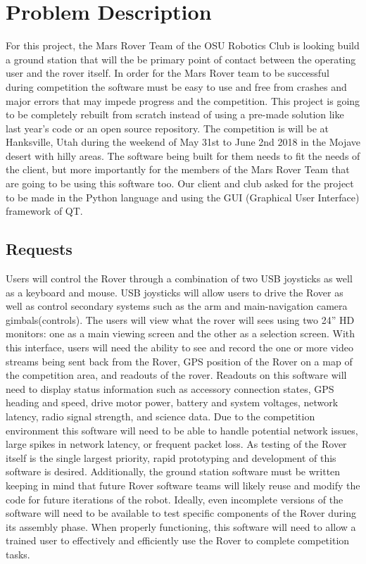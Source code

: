 \documentclass[onecolumn, draftclsnofoot, 10pt, compsoc]{IEEEtran}
\begin{document}
\section{Problem Description}\par
For this project, the Mars Rover Team of the OSU Robotics Club is looking build a ground station that will the be primary point of contact between the operating user and the rover itself.
In order for the Mars Rover team to be successful during competition the software must be easy to use and free from crashes and major errors that may impede progress and the competition.
This project is going to be completely rebuilt from scratch instead of using a pre-made solution like last year's code or an open source repository.
The competition is will be at Hanksville, Utah during the weekend of May 31st to June 2nd 2018 in the Mojave desert with hilly areas.
The software being built for them needs to fit the needs of the client, but more importantly for the members of the Mars Rover Team that are going to be using this software too. Our client and club asked for the project to be made in the Python language and using the GUI (Graphical User Interface) framework of QT.
\subsection{Requests}
Users will control the Rover through a combination of two USB joysticks as well as a keyboard and mouse.
USB joysticks will allow users to drive the Rover as well as control secondary systems such as the arm and main-navigation camera gimbals(controls). 
The users will view what the rover will sees using two 24” HD monitors: one as a main viewing screen and the other as a selection screen. 
With this interface, users will need the ability to see and record
the one or more video streams being sent back from the Rover, GPS position of the Rover on a map of the competition area, and readouts of the rover.
Readouts on this software will need to display status information such as accessory connection states, GPS heading and speed, drive motor power, battery and system voltages, network latency, radio signal strength, and science data. 
Due to the competition environment this software will need to be able to handle potential network issues, large spikes in network latency, or frequent packet loss. 
As testing of the Rover itself is the single largest priority, rapid prototyping and development of this software is desired.
Additionally, the ground station software must be written keeping in mind that future Rover software teams will likely reuse and modify the code for future iterations of the robot.
Ideally, even incomplete versions of the software will need to be available to test specific components of the Rover during its assembly phase. 
When properly functioning, this software will need to allow a trained user to effectively and efficiently use the Rover to complete competition tasks.
\end{document}
